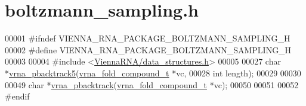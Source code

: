 \hypertarget{boltzmann__sampling_8h_source}{}\section{boltzmann\+\_\+sampling.\+h}
\label{boltzmann__sampling_8h_source}

\begin{DoxyCode}
00001 \textcolor{preprocessor}{#ifndef VIENNA\_RNA\_PACKAGE\_BOLTZMANN\_SAMPLING\_H}
00002 \textcolor{preprocessor}{#define VIENNA\_RNA\_PACKAGE\_BOLTZMANN\_SAMPLING\_H}
00003 
00004 \textcolor{preprocessor}{#include <\mbox{\hyperlink{data__structures_8h}{ViennaRNA/data\_structures.h}}>}
00005 
00027 \textcolor{keywordtype}{char} *\mbox{\hyperlink{group__subopt__stochbt_ga347375a4da8bdff74639529847f97d4f}{vrna\_pbacktrack5}}(\mbox{\hyperlink{group__fold__compound_structvrna__fc__s}{vrna\_fold\_compound\_t}} *vc,
00028                        \textcolor{keywordtype}{int}                  length);
00029 
00030 
00049 \textcolor{keywordtype}{char} *\mbox{\hyperlink{group__subopt__stochbt_ga901fe42a33b07be083421741bf7dc610}{vrna\_pbacktrack}}(\mbox{\hyperlink{group__fold__compound_structvrna__fc__s}{vrna\_fold\_compound\_t}} *vc);
00050 
00051 
00052 \textcolor{preprocessor}{#endif}
\end{DoxyCode}
